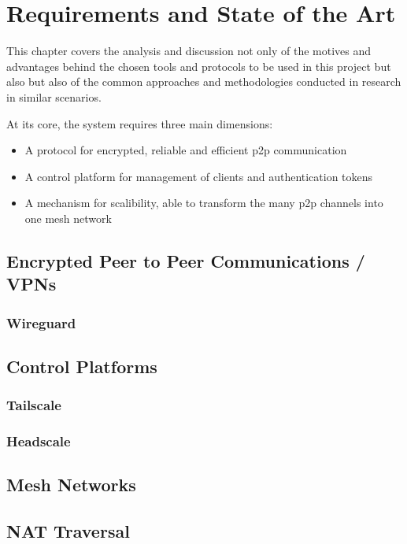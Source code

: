 

\chapter{Requirements and State of the Art}
\label{chapter:sota}

\begin{sota}
This chapter covers the analysis and discussion not only of the motives and advantages behind the chosen tools and protocols to be used in this project but also but also of the common approaches and methodologies conducted in research in similar scenarios.

At its core, the system requires three main dimensions:
\begin{itemize}
    \item{A protocol for encrypted, reliable and efficient \ac{p2p} communication}
    \item{A control platform for management of clients and authentication tokens}
    \item{A mechanism for scalibility, able to transform the many \ac{p2p} channels into one mesh network}
\end{itemize}
\end{sota}


\section{Encrypted Peer to Peer Communications / VPNs}

\subsection{Wireguard}

\section{Control Platforms}

\subsection{Tailscale}

\subsection{Headscale}

\section{Mesh Networks}

\section{NAT Traversal}

